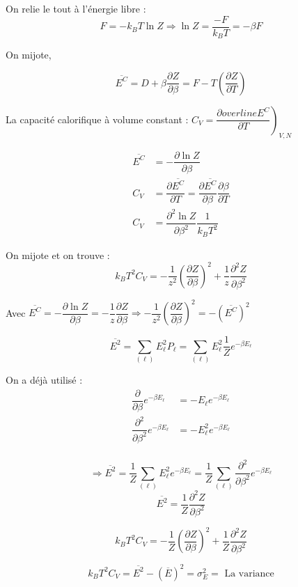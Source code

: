 \documentclass[12pt,a4paper]{report}
\begin{document}
On relie le tout à l'énergie libre :
\[
	F = -k_B T \ln Z \Rightarrow \ln Z = \dfrac{-F}{k_B T} = -\beta F
\]

On mijote,

\[
	\overline{E^C} = D + \beta  \dfrac{\partial Z}{\partial \beta} = F  - T\left(  \dfrac{\partial Z}{\partial T} \right)
\]

La capacité calorifique à volume constant : \(C_V = \left.  \dfrac{\partial overline{E^C}}{\partial T} \right)_{V, N} \)

\begin{align*}
	\overline{E^C} &= - \dfrac{\partial \ln Z}{\partial \beta}\\
	C_V &= \dfrac{\partial \overline{E^C}}{\partial T} = \dfrac{\partial \overline{E^C}}{\partial \beta} \dfrac{\partial \beta}{\partial T}\\
	C_V &= \dfrac{\partial^2 \ln Z}{\partial \beta^2} \dfrac{1}{k_B T^2}
\end{align*}

On mijote et on trouve :
\[
	k_B T^2 C_V = -\dfrac{1}{z^2} \left( \dfrac{\partial Z}{\partial \beta} \right)^2 + \dfrac{1}{z} \dfrac{\partial^2 Z}{\partial \beta^2}
\]

Avec \( \overline{E^C} = - \dfrac{\partial \ln Z}{\partial \beta} = -\dfrac{1}{z}  \dfrac{\partial Z}{\partial \beta} \Rightarrow -\dfrac{1}{z^2} \left( \dfrac{\partial Z}{\partial \beta} \right)^2 = - \left( \overline{E^C} \right)^2 \)

\[
	\overline{E^2} = \sum_{(\ell)} E_\ell^2 P_\ell = \sum_{(\ell)} E_\ell^2 \dfrac{1}{Z} e^{-\beta E_\ell}
\]

On a déjà utilisé :
\begin{align*}
	\dfrac{\partial}{\partial \beta} e^{-\beta E_\ell} &= - E_\ell e^{-\beta E_\ell}\\
	\dfrac{\partial^2}{\partial \beta^2} e^{-\beta E_\ell} &= - E_\ell^2 e^{-\beta E_\ell}\\
\end{align*}

\[
	\Rightarrow \overline{E^2} = \dfrac{1}{Z} \sum_{(\ell)} E_\ell^2 e^{-\beta E_\ell} = \dfrac{1}{Z} \sum_{(\ell)} \dfrac{\partial^2}{\partial \beta^2} e^{-\beta E_\ell}
\]
\[
	\overline{E^2} =  \dfrac{1}{Z} \dfrac{\partial^2 Z}{\partial \beta^2}
\]

\[
	k_B T^2 C_V = -\dfrac{1}{Z} \left( \dfrac{\partial Z}{\partial \beta}\right)^2 + \dfrac{1}{Z} \dfrac{\partial^2 Z}{\partial \beta^2}
\]

\[
	k_B T^2 C_V = \overline{E^2} - \left(\overline{E}\right)^2 = \sigma_E^2 = \text{ La variance}
\]
\end{document}
